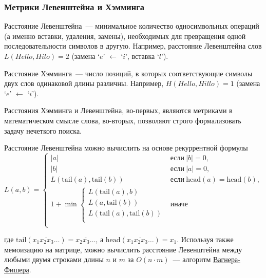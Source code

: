 \subsubsection{Метрики Левенштейна и Хэмминга}
Расстояние Левенштейна~--- минимальное количество односимвольных операций (а именно вставки, удаления, замены),
необходимых для превращения одной последовательности символов в другую.
Например, расстояние Левенштейна слов \(L(Hello, Hilo) = 2\) (замена `\(e\)' \(\gets\) `\(i\)', вставка `\(l\)').

Расстояние Хэмминга~--- число позиций, в которых соответствующие символы двух слов одинаковой длины различны. Например,
\(H(Hello, Hillo) = 1\) (замена `\(e\)' \(\gets\) `\(i\)').

Расстояния Хэмминга и Левенштейна, во-первых, являются метриками в математическом смысле слова, во-вторых, позволяют строго
формализовать задачу нечеткого поиска.

Расстояние Левенштейна можно вычислить на основе рекуррентной формулы \[L(a,b) = \begin{cases}
    |a|                                  & \text{если}~|b| = 0,                         \\
    |b|                                  & \text{если}~|a| = 0,                         \\
    L(\text{tail}(a), \text{tail}(b))    & \text{если}~\text{head}(a) = \text{head}(b), \\
    1 + \min \begin{cases}
               L(\text{tail}(a), b)              \\
               L(a, \text{tail}(b))              \\
               L(\text{tail}(a), \text{tail}(b)) \\
             \end{cases} & \text{иначе}                                          \\
  \end{cases}
\]

где \(\text{tail}(\overline{x_1x_2x_3\dots}) = \overline{x_2x_3\dots}\), а \(\text{head}(\overline{x_1x_2x_3\dots}) = x_1\).
Используя также мемоизацию на матрице, можно вычислить расстояние Левенштейна между любыми двумя строками длины \(n\) и \(m\) за
\(O(n\cdot m)\)~--- алгоритм \href{https://neerc.ifmo.ru/wiki/index.php?title=%D0%97%D0%B0%D0%B4%D0%B0%D1%87%D0%B0_%D0%BE_%D1%80%D0%B5%D0%B4%D0%B0%D0%BA%D1%86%D0%B8%D0%BE%D0%BD%D0%BD%D0%BE%D0%BC_%D1%80%D0%B0%D1%81%D1%81%D1%82%D0%BE%D1%8F%D0%BD%D0%B8%D0%B8,_%D0%B0%D0%BB%D0%B3%D0%BE%D1%80%D0%B8%D1%82%D0%BC_%D0%92%D0%B0%D0%B3%D0%BD%D0%B5%D1%80%D0%B0-%D0%A4%D0%B8%D1%88%D0%B5%D1%80%D0%B0}{Вагнера-Фишера}.

